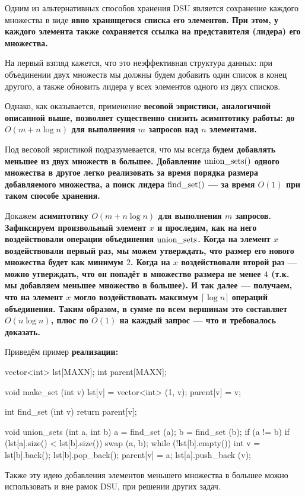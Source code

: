 Одним из альтернативных способов хранения DSU является сохранение каждого множества в виде \bf{явно хранящегося списка его элементов}. При этом, у каждого элемента также сохраняется ссылка на представителя (лидера) его множества.

На первый взгляд кажется, что это неэффективная структура данных: при объединении двух множеств мы должны будем добавить один список в конец другого, а также обновить лидера у всех элементов одного из двух списков.

Однако, как оказывается, применение \bf{весовой эвристики}, аналогичной описанной выше, позволяет существенно снизить асимптотику работы: до $O(m + n \log n)$ для выполнения $m$ запросов над $n$ элементами.

Под весовой эвристикой подразумевается, что мы всегда \bf{будем добавлять меньшее из двух множеств в большее}. Добавление ${\rm union\_sets}()$ одного множества в другое легко реализовать за время порядка размера добавляемого множества, а поиск лидера ${\rm find\_set}()$ --- за время $O(1)$ при таком способе хранения.

Докажем \bf{асимптотику} $O(m + n \log n)$ для выполнения $m$ запросов. Зафиксируем произвольный элемент $x$ и проследим, как на него воздействовали операции объединения ${\rm union\_sets}$. Когда на элемент $x$ воздействовали первый раз, мы можем утверждать, что размер его нового множества будет как минимум $2$. Когда на $x$ воздействовали второй раз --- можно утверждать, что он попадёт в множество размера не менее $4$ (т.к. мы добавляем меньшее множество в большее). И так далее --- получаем, что на элемент $x$ могло воздействовать максимум $\lceil \log n \rceil$ операций объединения. Таким образом, в сумме по всем вершинам это составляет $O (n \log n)$, плюс по $O(1)$ на каждый запрос --- что и требовалось доказать.

Приведём пример \bf{реализации}:

\code
vector<int> lst[MAXN];
int parent[MAXN];

void make_set (int v) {
	lst[v] = vector<int> (1, v);
	parent[v] = v;
}

int find_set (int v) {
	return parent[v];
}

void union_sets (int a, int b) {
	a = find_set (a);
	b = find_set (b);
	if (a != b) {
		if (lst[a].size() < lst[b].size())
			swap (a, b);
		while (!lst[b].empty()) {
			int v = lst[b].back();
			lst[b].pop_back();
			parent[v] = a;
			lst[a].push_back (v);
		}
	}
}
\endcode

Также эту идею добавления элементов меньшего множества в большее можно использовать и вне рамок DSU, при решении других задач.


